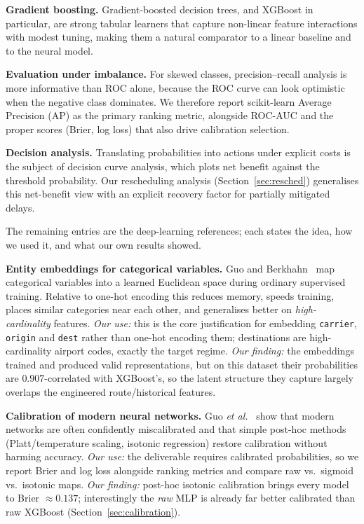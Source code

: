 \documentclass[conference]{IEEEtran}
\newcommand{\code}[1]{\texttt{#1}}
\begin{document}
\textbf{Gradient boosting.} Gradient-boosted decision trees, and XGBoost in
particular, are strong tabular learners that capture non-linear feature
interactions with modest tuning, making them a natural comparator to a linear
baseline and to the neural model.

\textbf{Evaluation under imbalance.} For skewed classes, precision--recall
analysis is more informative than ROC alone, because the ROC curve can look
optimistic when the negative class dominates. We therefore report scikit-learn
Average Precision (AP) as the primary ranking metric, alongside ROC-AUC and the
proper scores (Brier, log loss) that also drive calibration selection.

\textbf{Decision analysis.} Translating probabilities into actions under
explicit costs is the subject of decision curve analysis, which plots net
benefit against the threshold probability. Our rescheduling analysis
(Section~\ref{sec:resched}) generalises this net-benefit view with an explicit
recovery factor for partially mitigated delays.

The remaining entries are the deep-learning references; each states the idea,
how we used it, and what our own results showed.

\textbf{Entity embeddings for categorical variables.}
Guo and Berkhahn~\cite{entityembed} map categorical variables into a learned
Euclidean space during ordinary supervised training. Relative to one-hot
encoding this reduces memory, speeds training, places similar categories near
each other, and generalises better on \emph{high-cardinality} features.
\emph{Our use:} this is the core justification for embedding \code{carrier},
\code{origin} and \code{dest} rather than one-hot encoding them; destinations are
high-cardinality airport codes, exactly the target regime.
\emph{Our finding:} the embeddings trained and produced valid representations,
but on this dataset their probabilities are $0.907$-correlated with XGBoost's,
so the latent structure they capture largely overlaps the engineered
route/historical features.

\textbf{Calibration of modern neural networks.}
Guo \emph{et al.}~\cite{guo} show that modern networks are often confidently
miscalibrated and that simple post-hoc methods (Platt/temperature scaling,
isotonic regression) restore calibration without harming accuracy.
\emph{Our use:} the deliverable requires calibrated probabilities, so we report
Brier and log loss alongside ranking metrics and compare raw vs.\ sigmoid vs.\
isotonic maps. \emph{Our finding:} post-hoc isotonic calibration brings every
model to Brier $\approx 0.137$; interestingly the \emph{raw} MLP is already far
better calibrated than raw XGBoost (Section~\ref{sec:calibration}).
\end{document}
